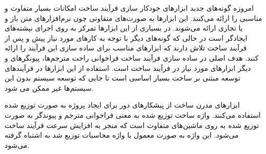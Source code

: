 
امروزه گونه‌های جدید ابزارهای خودکار سازی فرآیند ساخت امکانات بسیار متفاوت و
مناسبی را ارائه می‌کنند.
این ابزارها به صورت‌های متفاوتی چون نرم‌افزارهای متن باز و یا تجاری ارائه
می‌شوند.
در بسیاری از این ابزارها تمرکز به روی اجرای نپشته‌های ایجادگر است در حالی که
گونه‌های دیگر با توجه به کارهای مورد نیاز پیش و پس از فرآیند ساخت تلاش دارند که
ابزارهای مناسب برای ساده سازی این فرآیند را ارائه کنند. هدف اصلی در ساده سازی
فرآیند ساخت فراخوانی راحت مترجم‌ها، پیونگرهای و دیگر ابزارهای مورد نیاز در
فرآیند ساخت است.
استفاده از این ابزارها در فرآیندهای توسعه مبتنی بر ساخت بسیار اساسی است تا جایی که توسعه سیستم بدون این سیستم‌ها غیر ممکن
می شود.



ابزارهای مدرن ساخت از پیشکارهای دور برای ایجاد پروژه به صورت
توزیع شده استفاده می‌کنند. واژه ساخت توزیع شده به معنی فراخوانی مترجم و پیوندگر به صورت توزیع شده به روی ماشین‌های
متفاوت است که منجر به افزایش سرعت فرآیند ساخت می‌شود.
این واژه به صورت معمول با واژه محاسبات توزیع شد به اشتباه گرفته می‌شود.

% 
% 
% 
% 

